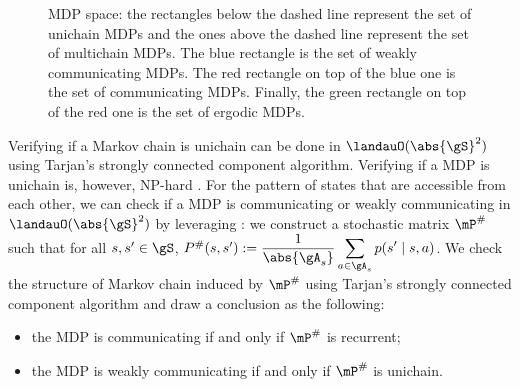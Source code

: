 \begin{figure}[ht]
    \centering
    \caption{MDP space: the rectangles below the dashed line represent the set of unichain MDPs and the ones above the dashed line represent the set of multichain MDPs.
        The blue rectangle is the set of weakly communicating MDPs.
        The red rectangle on top of the blue one is the set of communicating MDPs.
        Finally, the green rectangle on top of the red one is the set of ergodic MDPs.
    }
    \label{fig:mdp_class}
\end{figure}

Verifying if a Markov chain is unichain can be done in $\landauO(\abs{\gS}^2)$ using Tarjan's strongly connected component algorithm.
Verifying if a MDP is unichain is, however, NP-hard \cite{tsitsiklis2007np}.
For the pattern of states that are accessible from each other, we can check if a MDP is communicating or weakly communicating in $\landauO(\abs{\gS}^2)$ by leveraging \cite[Proposition~8.3.1]{puterman2014markov}:
we construct a stochastic matrix $\mP^{\#}$ such that for all $s,s'\in\gS$, $P^{\#}(s,s'):=\displaystyle\frac1{\abs{\gA_s}}\sum_{a\in\gA_s}p(s'\mid s,a)$.
We check the structure of Markov chain induced by $\mP^{\#}$ using Tarjan's strongly connected component algorithm and draw a conclusion as the following:
\begin{itemize}
    \item the MDP is communicating if and only if $\mP^{\#}$ is recurrent;
    \item the MDP is weakly communicating if and only if $\mP^{\#}$ is unichain. 
\end{itemize}

